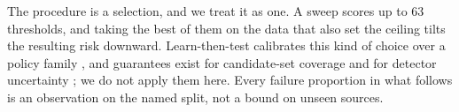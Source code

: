 The procedure is a selection, and we treat it as one. A sweep scores up to
63 thresholds, and taking the best of them on the data that also set the
ceiling tilts the resulting risk downward. Learn-then-test calibrates this
kind of choice over a policy family \cite{angelopoulos2021learn}, and
guarantees exist for candidate-set coverage \cite{li2022pac} and for
detector uncertainty \cite{su2024motcup}; we do not apply them here. Every
failure proportion in what follows is an observation on the named split,
not a bound on unseen sources.
